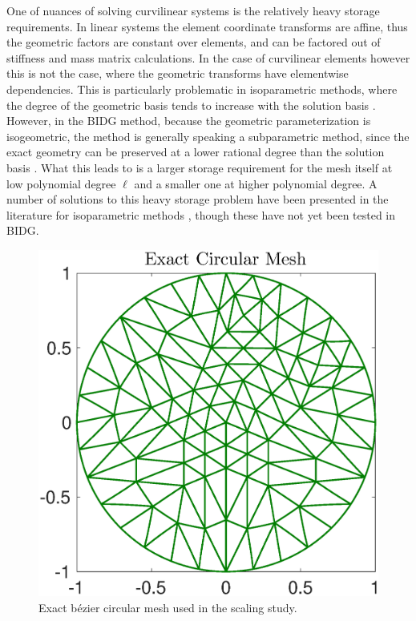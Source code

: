 One of nuances of solving curvilinear systems is the relatively heavy storage requirements.  In linear systems the element coordinate transforms are affine, thus the geometric factors are constant over elements, and can be factored out of stiffness and mass matrix calculations.  In the case of curvilinear elements however this is not the case, where the geometric transforms have elementwise dependencies.  This is particularly problematic in isoparametric methods, where the degree of the geometric basis tends to increase with the solution basis \cite{doi:10.1137/120899662}.  However, in the BIDG method, because the geometric parameterization is isogeometric, the method is generally speaking a subparametric method, since the exact geometry can be preserved at a lower rational degree than the solution basis  \cite{Michoski2016658}.  What this leads to is a larger storage requirement for the mesh itself at low polynomial degree $\ell$ and a smaller one at higher polynomial degree.  A number of solutions to this heavy storage problem have been presented in the literature for isoparametric methods \cite{doi:10.1137/120899662}, though these have not yet been tested in BIDG.


\begin{figure}
\begin{center}
\includegraphics[width=0.8\linewidth]{./bidg_data/168_circ}
\end{center}
\vspace*{-.5cm}
\caption{Exact b\'{e}zier circular mesh used in the scaling study.}
\label{fig:168_circ}
\end{figure}

